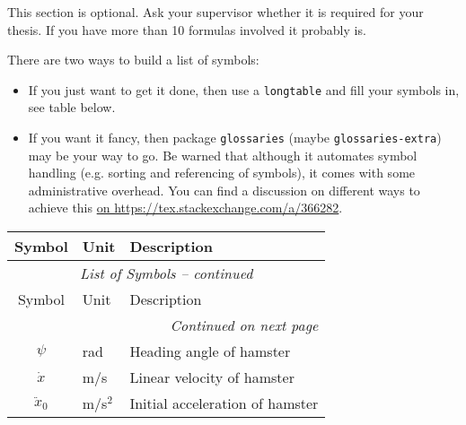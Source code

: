 \cleardoublepage
{}

This section is optional. 
Ask your supervisor whether it is required for your thesis. 
If you have more than 10 formulas involved it probably is.

There are two ways to build a list of symbols:

\begin{itemize}
    \item If you just want to get it done, then use a \texttt{longtable} and fill your symbols in, see table below.
    \item If you want it fancy, then package \texttt{glossaries} (maybe \texttt{glossaries-extra}) may be your way to go. 
    Be warned that although it automates symbol handling (e.g. sorting and referencing of symbols), it comes with some administrative overhead. 
    You can find a discussion on different ways to achieve this \href{https://tex.stackexchange.com/a/366282}{on https://tex.stackexchange.com/a/366282}.
\end{itemize}
\centering
\begin{longtable}{@{}c l p{10cm}@{}}
\toprule
Symbol & Unit & Description \\
\midrule
\endfirsthead
\multicolumn{3}{c}{\textit{List of Symbols -- continued}}\\
\toprule
Symbol & Unit & Description \\
\midrule
\endhead
\bottomrule \multicolumn{3}{r}{\textit{Continued on next page}} \\
\endfoot
\bottomrule
\endlastfoot

\(\psi\) & rad & Heading angle of hamster \\
\(\dot x\) & m/s & Linear velocity of hamster \\
\(\ddot x_0\) & m/s$^2$ & Initial acceleration of hamster \\
\end{longtable}
